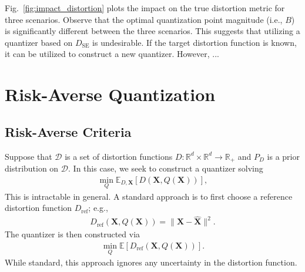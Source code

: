 \documentclass[conference]{IEEEtran}
\begin{document}
Fig.~\ref{fig:impact_distortion} plots the impact on the true distortion metric for three scenarios. Observe that the optimal quantization point magnitude (i.e., $B$) is significantly different between the three scenarios. This suggests that utilizing a quantizer based on $D_{\mathrm{SE}}$ is undesirable. If the target distortion function is known, it can be utilized to construct a new quantizer. However, ...  

\section{Risk-Averse Quantization}

\subsection{Risk-Averse Criteria}

Suppose that $\mathcal{D}$ is a set of distortion functions $D: \mathbb{R}^d \times \mathbb{R}^d \rightarrow \mathbb{R}_+$ and $P_D$ is a prior distribution on $\mathcal{D}$. In this case, we seek to construct a quantizer solving
\begin{align}
\min_Q \mathbb{E}_{D,\mathbf{X}}[D(\mathbf{X},Q(\mathbf{X}))],
\end{align}
This is intractable in general. A standard approach is to first choose a reference distortion function $D_{\mathrm{ref}}$; e.g., 
\begin{align}
D_{\mathrm{ref}}(\mathbf{X},Q(\mathbf{X})) = \|\mathbf{X} - \hat{\mathbf{X}}\|^2.
\end{align}
The quantizer is then constructed via 
\begin{align}
\min_Q \mathbb{E}[D_{\mathrm{ref}}(\mathbf{X},Q(\mathbf{X}))].
\end{align}
While standard, this approach ignores any uncertainty in the distortion function. 
\end{document}

